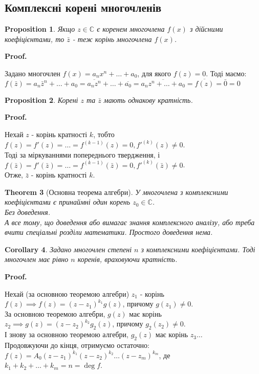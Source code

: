 \documentclass[a4paper, 10pt]{extarticle}
\makeatletter
\def\qed{$\blacksquare$}
\def\qed{$\blacksquare$}
\theoremstyle{theoremdd}
\newtheorem{theorem}{Theorem}[subsection]
\theoremstyle{theoremdd}
\theoremstyle{theoremdd}
\theoremstyle{theoremdd}
\theoremstyle{theoremdd}
\newtheorem{proposition}[theorem]{Proposition}
\theoremstyle{theoremdd}
\theoremstyle{theoremdd}
\theoremstyle{theoremdd}
\newtheorem{corollary}[theorem]{Corollary}
\renewenvironment{proof}[1][Proof.\\]{\par
\pushQED{\hfill \qed}%
\normalfont \topsep6\p@\@plus6\p@\relax
\trivlist
\item\relax
{\bfseries
#1\@addpunct{.}}\hspace\labelsep\ignorespaces
}{%
\popQED\endtrivlist\@endpefalse
}
\makeatother
\begin{document}
\subsection{Комплексні корені многочленів}
\begin{proposition}
Якщо $z \in \mathbb{C}$ є коренем многочлена $f(x)$ з дійсними коефіцієнтами, то $\bar{z}$ - теж корінь многочлена $f(x)$.
\end{proposition}

\begin{proof}
Задано многочлен $f(x) = a_n x^n + \dots + a_0$, для якого $f(z) = 0$. Тоді маємо:\\
$f(\bar{z}) = a_n \bar{z}^n + \dots + a_0 = \overline{a_n z^n} + \dots + \overline{a_0} = \overline{a_n z^n + \dots + a_0} = \overline{f(z)} = \bar{0} = 0$
\end{proof}

\begin{proposition}
Корені $z$ та $\bar{z}$ мають однакову кратність.
\end{proposition}

\begin{proof}
Нехай $z$ - корінь кратності $k$, тобто $f(z) = f'(z) = \dots = f^{(k-1)}(z) = 0, f'^{(k)}(z) \neq 0$.\\
Тоді за міркуваннями попереднього твердження, і$f(\bar{z}) = f'(\bar{z}) = \dots = f^{(k-1)}(\bar{z}) = 0, f'^{(k)}(\bar{z}) \neq 0$. \\ Отже, $\bar{z}$ - корінь кратності $k$.
\end{proof}

\begin{theorem}[Основна теорема алгебри]
У многочлена з комплексними коефіцієнтами є принаймні один корень $z_0 \in \mathbb{C}$.\\
\textit{Без доведення.}\\
\textit{А все тому, що доведення або вимагає знання комплексного аналізу, або треба вчити спеціальні розділи математики. Простого доведення нема.}
\end{theorem}

\begin{corollary}
Задано многочлен степені $n$ з комплексними коефіцієнтами. Тоді многочлен має рівно $n$ коренів, враховуючи кратність.
\end{corollary}

\begin{proof}
Нехай (за основною теоремою алгебри) $z_1$ - корінь $f(z) \implies f(z) = (z-z_1)^{k_1} g(z)$, причому $g(z_1) \neq 0$.\\
За основною теоремою алгебри, $g(z)$ має корінь $z_2 \implies g(z) = (z-z_2)^{k_2} g_2(z)$, причому $g_2(z_2) \neq 0$.\\
І знову за основною теоремою алгебри, $g_2(z)$ має корінь $z_3\dots$\\
Продовжуючи до кінця, отримуємо остаточно:\\
$f(z) = A_0(z-z_1)^{k_1}(z-z_2)^{k_2}\dots(z-z_m)^{k_m}$, де \hspace{0.5cm} $k_1 + k_2 + \dots + k_m = n = \deg f$.
\end{proof}
\end{document}
